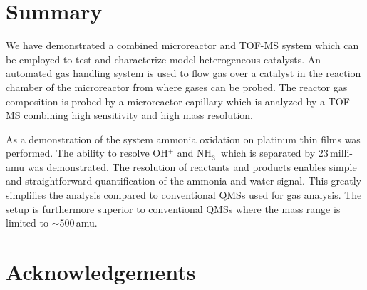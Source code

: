 \documentclass[aip,rsi]{revtex4-1}
\begin{document}

\section{Summary}
We have demonstrated a combined microreactor and TOF-MS system which can be employed to test and characterize model heterogeneous catalysts. An automated gas handling system is used to flow gas over a catalyst in the reaction chamber of the microreactor from where gases can be probed. The reactor gas composition is probed by a microreactor capillary which is analyzed by a TOF-MS combining high sensitivity and high mass resolution.

As a demonstration of the system ammonia oxidation on platinum thin films was performed. The ability to resolve OH$^{+}$ and NH$_3^+$ which is separated by 23\,milli-amu was demonstrated. The resolution of reactants and products enables simple and straightforward quantification of the ammonia and water signal. This greatly simplifies the analysis compared to conventional QMSs used for gas analysis. The setup is furthermore superior to conventional QMSs where the mass range is limited to $\sim$500\,amu.

\section{Acknowledgements}


%
%

%
\end{document}
